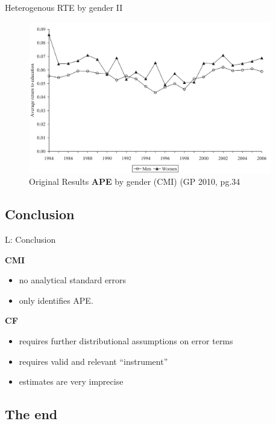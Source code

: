 \documentclass[10pt,ignorenonframetext,]{beamer}
\providecommand{\tightlist}{%
  \setlength{\itemsep}{0pt}\setlength{\parskip}{0pt}}
\begin{document}
\begin{frame}{Heterogenous RTE by gender II}
\protect\hypertarget{heterogenous-rte-by-gender-ii}{}

\begin{figure}
\centering
\includegraphics[width=\textwidth,height=2.60417in]{img/GP2010_CMI_gender.png}
\caption{Original Results \textbf{APE} by gender (CMI) (GP 2010, pg.34}
\end{figure}

\end{frame}

\hypertarget{conclusion}{%
\subsection{Conclusion}\label{conclusion}}

\begin{frame}{L: Conclusion}
\protect\hypertarget{l-conclusion}{}

\textbf{CMI}

\begin{itemize}
\tightlist
\item
  no analytical standard errors
\item
  only identifies APE.
\end{itemize}

\textbf{CF}

\begin{itemize}
\tightlist
\item
  requires further distributional assumptions on error terms
\item
  requires valid and relevant ``instrument''
\item
  estimates are very imprecise
\end{itemize}

\end{frame}

\hypertarget{the-end}{%
\subsection{The end}\label{the-end}}
\end{document}
